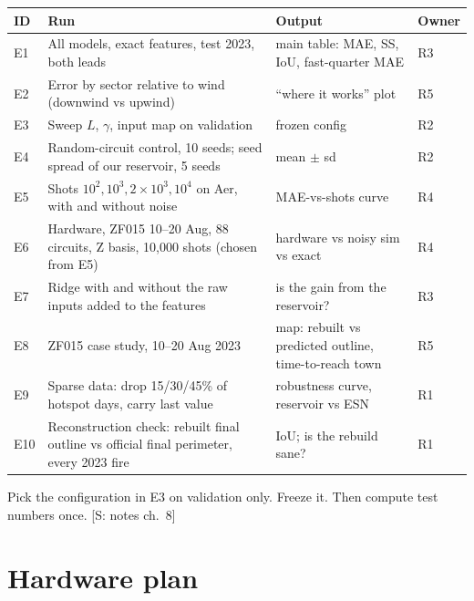 \documentclass[11pt,a4paper]{article}
\newcommand{\tagbox}[2]{{\footnotesize\color{#1}\textsf{[#2]}}}
\newcommand{\supp}[1]{\tagbox{ForestGreen!70!black}{S: #1}}  %
\begin{document}
\begin{center}\small
\begin{tabularx}{\linewidth}{@{}l Y Y l@{}}
\toprule
\textbf{ID} & \textbf{Run} & \textbf{Output} & \textbf{Owner}\\
\midrule
E1 & All models, exact features, test 2023, both leads & main table: MAE, SS, IoU, fast-quarter MAE & R3\\
E2 & Error by sector relative to wind (downwind vs upwind) & ``where it works'' plot & R5\\
E3 & Sweep $L$, $\gamma$, input map on validation & frozen config & R2\\
E4 & Random-circuit control, 10 seeds; seed spread of our reservoir, 5 seeds & mean $\pm$ sd & R2\\
E5 & Shots $10^2,10^3,2{\times}10^3,10^4$ on Aer, with and without noise & MAE-vs-shots curve & R4\\
E6 & Hardware, ZF015 10--20 Aug, 88 circuits, Z basis, 10{,}000 shots (chosen from E5) & hardware vs noisy sim vs exact & R4\\
E7 & Ridge with and without the raw inputs added to the features & is the gain from the reservoir? & R3\\
E8 & ZF015 case study, 10--20 Aug 2023 & map: rebuilt vs predicted outline, time-to-reach town & R5\\
E9 & Sparse data: drop 15/30/45\% of hotspot days, carry last value & robustness curve, reservoir vs ESN & R1\\
E10 & Reconstruction check: rebuilt final outline vs official final perimeter, every 2023 fire & IoU; is the rebuild
sane? & R1\\
\bottomrule
\end{tabularx}
\end{center}

\begin{teamrule}
Pick the configuration in E3 on validation only. Freeze it. Then compute test numbers once. \supp{notes ch.~8}
\end{teamrule}

\section{Hardware plan}
\end{document}
